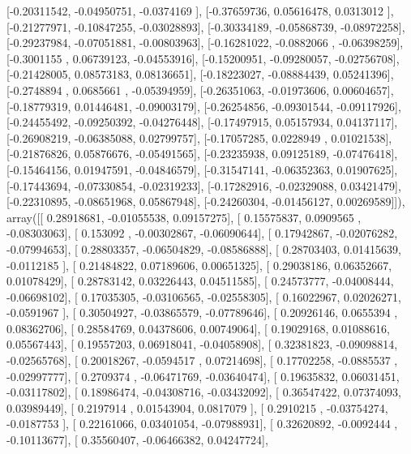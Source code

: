 \documentclass{article}
\begin{document}
       [-0.20311542, -0.04950751, -0.0374169 ],
       [-0.37659736,  0.05616478,  0.0313012 ],
       [-0.21277971, -0.10847255, -0.03028893],
       [-0.30334189, -0.05868739, -0.08972258],
       [-0.29237984, -0.07051881, -0.00803963],
       [-0.16281022, -0.0882066 , -0.06398259],
       [-0.3001155 ,  0.06739123, -0.04553916],
       [-0.15200951, -0.09280057, -0.02756708],
       [-0.21428005,  0.08573183,  0.08136651],
       [-0.18223027, -0.08884439,  0.05241396],
       [-0.2748894 ,  0.0685661 , -0.05394959],
       [-0.26351063, -0.01973606,  0.00604657],
       [-0.18779319,  0.01446481, -0.09003179],
       [-0.26254856, -0.09301544, -0.09117926],
       [-0.24455492, -0.09250392, -0.04276448],
       [-0.17497915,  0.05157934,  0.04137117],
       [-0.26908219, -0.06385088,  0.02799757],
       [-0.17057285,  0.0228949 ,  0.01021538],
       [-0.21876826,  0.05876676, -0.05491565],
       [-0.23235938,  0.09125189, -0.07476418],
       [-0.15464156,  0.01947591, -0.04846579],
       [-0.31547141, -0.06352363,  0.01907625],
       [-0.17443694, -0.07330854, -0.02319233],
       [-0.17282916, -0.02329088,  0.03421479],
       [-0.22310895, -0.08651968,  0.05867948],
       [-0.24260304, -0.01456127,  0.00269589]]), array([[ 0.28918681, -0.01055538,  0.09157275],
       [ 0.15575837,  0.0909565 , -0.08303063],
       [ 0.153092  , -0.00302867, -0.06090644],
       [ 0.17942867, -0.02076282, -0.07994653],
       [ 0.28803357, -0.06504829, -0.08586888],
       [ 0.28703403,  0.01415639, -0.0112185 ],
       [ 0.21484822,  0.07189606,  0.00651325],
       [ 0.29038186,  0.06352667,  0.01078429],
       [ 0.28783142,  0.03226443,  0.04511585],
       [ 0.24573777, -0.04008444, -0.06698102],
       [ 0.17035305, -0.03106565, -0.02558305],
       [ 0.16022967,  0.02026271, -0.0591967 ],
       [ 0.30504927, -0.03865579, -0.07789646],
       [ 0.20926146,  0.0655394 ,  0.08362706],
       [ 0.28584769,  0.04378606,  0.00749064],
       [ 0.19029168,  0.01088616,  0.05567443],
       [ 0.19557203,  0.06918041, -0.04058908],
       [ 0.32381823, -0.09098814, -0.02565768],
       [ 0.20018267, -0.0594517 ,  0.07214698],
       [ 0.17702258, -0.0885537 , -0.02997777],
       [ 0.2709374 , -0.06471769, -0.03640474],
       [ 0.19635832,  0.06031451, -0.03117802],
       [ 0.18986474, -0.04308716, -0.03432092],
       [ 0.36547422,  0.07374093,  0.03989449],
       [ 0.2197914 ,  0.01543904,  0.0817079 ],
       [ 0.2910215 , -0.03754274, -0.0187753 ],
       [ 0.22161066,  0.03401054, -0.07988931],
       [ 0.32620892, -0.0092444 , -0.10113677],
       [ 0.35560407, -0.06466382,  0.04247724],
\end{document}
